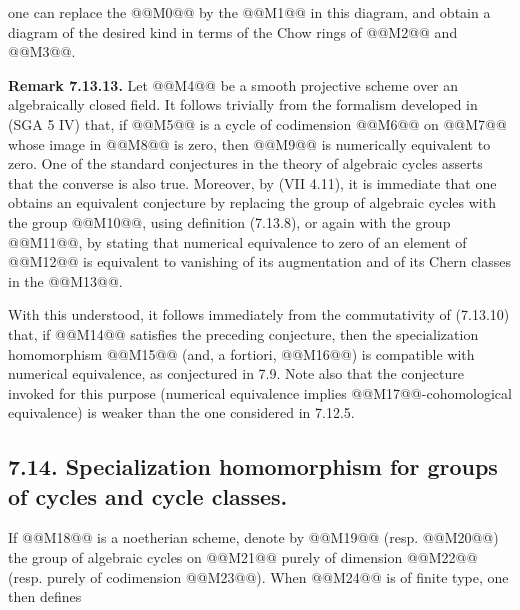 one can replace the @@M0@@ by the @@M1@@ in this diagram, and obtain a diagram of the desired kind in terms of the Chow rings of @@M2@@ and @@M3@@.

\textbf{Remark 7.13.13.} Let @@M4@@ be a smooth projective scheme over an algebraically closed field. It follows trivially from the formalism developed in (SGA 5 IV) that, if @@M5@@ is a cycle of codimension @@M6@@ on @@M7@@ whose image in @@M8@@ is zero, then @@M9@@ is numerically equivalent to zero. One of the standard conjectures in the theory of algebraic cycles asserts that the converse is also true. Moreover, by (VII 4.11), it is immediate that one obtains an equivalent conjecture by replacing the group of algebraic cycles with the group @@M10@@, using definition (7.13.8), or again with the group @@M11@@, by stating that numerical equivalence to zero of an element of @@M12@@ is equivalent to vanishing of its augmentation and of its Chern classes in the @@M13@@.

With this understood, it follows immediately from the commutativity of (7.13.10) that, if @@M14@@ satisfies the preceding conjecture, then the specialization homomorphism @@M15@@ (and, a fortiori, @@M16@@) is compatible with numerical equivalence, as conjectured in 7.9. Note also that the conjecture invoked for this purpose (numerical equivalence implies @@M17@@-cohomological equivalence) is weaker than the one considered in 7.12.5.

\subsection*{7.14. Specialization homomorphism for groups of cycles and cycle classes.}
If @@M18@@ is a noetherian scheme, denote by @@M19@@ (resp. @@M20@@) the group of algebraic cycles on @@M21@@ purely of dimension @@M22@@ (resp. purely of codimension @@M23@@). When @@M24@@ is of finite type, one then defines
